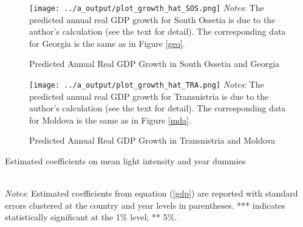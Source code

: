 \documentclass[12pt,a4paper]{article}%
\begin{document}
\begin{figure}[ptb]
\caption{Predicted Annual Real GDP Growth in South Ossetia and Georgia}%
\label{sos}%
\texttt{[image: ../a\_output/plot\_growth\_hat\_SOS.png]}
{\scriptsize \textit{Notes}: 
	The predicted annual real GDP growth for South Ossetia is due to the author's calculation (see the text for detail).
	The corresponding data for Georgia is the same as in Figure \ref{geo}.
}
\end{figure}

\begin{figure}[ptb]
\caption{Predicted Annual Real GDP Growth in Transnistria and Moldova}%
\label{tra}%
\texttt{[image: ../a\_output/plot\_growth\_hat\_TRA.png]}
{\scriptsize \textit{Notes}: 
	The predicted annual real GDP growth for Transnistria is due to the author's calculation (see the text for detail).
	The corresponding data for Moldova is the same as in Figure \ref{mda}.
}
\end{figure}

\begin{table}[ptb]
\caption{Estimated coefficients on mean light intensity and year dummies}%
\label{estimates}%
\\
{\scriptsize \textit{Notes}: 
	Estimated coefficients from equation (\ref{gdp}) are reported with standard errors clustered at the country and year levels in parentheses. *** indicates statistically significant at the 1\% level; ** 5\%.
}
\end{table}
\end{document}
